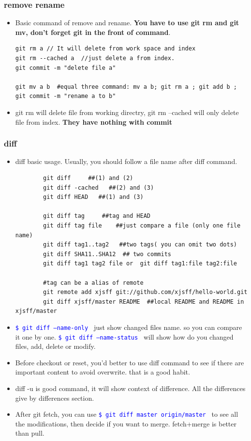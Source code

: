 \documentclass[a4paper,11pt,twoside]{book}
\newcommand{\linuxcommand}[1]{\texttt{\textcolor{blue}{\$ #1 \Pisymbol{psy}{191}}}}
\begin{document}
\subsubsection{remove rename}
\begin{itemize}
	\item Basic command of remove and rename.  \textbf{You have to use git rm and git mv, don't forget git in the front of command}.
\begin{verbatim}
git rm a // It will delete from work space and index
git rm --cached a  //just delete a from index.
git commit -m "delete file a"

git mv a b  #equal three command: mv a b; git rm a ; git add b ;
git commit -m "rename a to b"		
\end{verbatim}	

	\item git rm will delete file from working directry, git rm --cached will only delete file from index. \textbf{They have nothing with commit}
\end{itemize}

\subsubsection{diff}
\begin{itemize}
	\item diff basic usage. Usually, you should follow a file name after diff command. 
	
	\begin{verbatim}
		git diff     ##(1) and (2)
		git diff -cached   ##(2) and (3)
		git diff HEAD   ##(1) and (3)
		
		git diff tag     ##tag and HEAD
		git diff tag file    ##just compare a file (only one file name)
		git diff tag1..tag2   ##two tags( you can omit two dots)
		git diff SHA11..SHA12  ## two commits
		git diff tag1 tag2 file or  git diff tag1:file tag2:file
		
		#tag can be a alias of remote
		git remote add xjsff git://github.com/xjsff/hello-world.git
		git diff xjsff/master README  ##local README and README in xjsff/master
	\end{verbatim}
	\item \linuxcommand{git diff --name-only} just show changed files name. so you can compare it one by one.  \linuxcommand{git diff --name-status} will show how do you changed files, add, delete or modify. 
	
	\item Before checkout or reset, you'd better to use diff command to see if there are important content to avoid overwrite. that is a good habit. 
	
	\item diff -u is good command, it will show context of difference.  All the differences give by differences section.
	
	\item  After git fetch, you can use \linuxcommand{git diff master origin/master} to see all the modifications, then decide if you want to merge. fetch+merge is better than pull.
	
\end{itemize}
\end{document}

